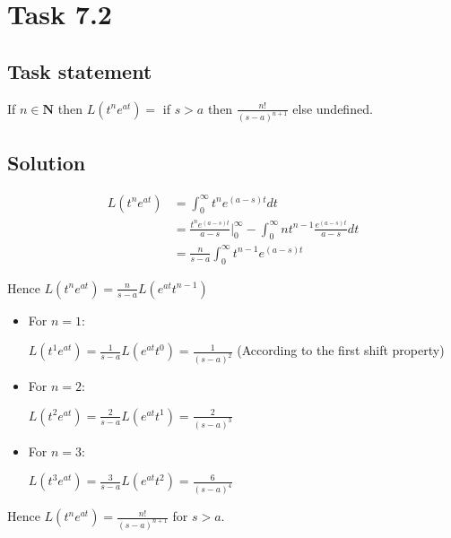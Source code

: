 \section*{Task 7.2}

\subsection*{Task statement}

If $n \in \mathbf{N}$ then $L(t^n e^{at}) = $ if $s > a$ then $\frac{n!}{(s - a)^{n + 1}}$ else undefined.

\subsection*{Solution}

\begin{displaymath}
    \begin{aligned}
        L(t^n e^{at}) & = \int_0^{\infty} t^n e^{(a - s)t} dt \\
        & = \frac{t^n e^{(a - s)t}}{a - s} \Bigr|_0^{\infty} - \int_0^{\infty} nt^{n - 1} \frac{e^{(a - s)t}}{a - s} dt \\
        & = \frac{n}{s - a} \int_0^{\infty} t^{n - 1} e^{(a - s)t}
    \end{aligned}
\end{displaymath}

Hence $L(t^n e^{at}) = \frac{n}{s - a} L(e^{at} t^{n - 1})$

\begin{itemize}
    \item For $n = 1$:
    
        $L(t^1 e^{at}) = \frac{1}{s - a} L(e^{at} t^0) = \frac{1}{(s - a)^2}$ (According to the first shift property)
    
    \item For $n = 2$:
    
        $L(t^2 e^{at}) = \frac{2}{s - a} L(e^{at} t^1) = \frac{2}{(s - a)^3}$

    \item For $n = 3$:
    
        $L(t^3 e^{at}) = \frac{3}{s - a} L(e^{at} t^2) = \frac{6}{(s - a)^4}$
\end{itemize}

Hence $L(t^n e^{at}) = \frac{n!}{(s - a)^{n + 1}}$ for $s > a$.
